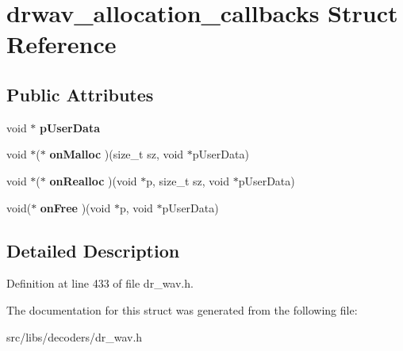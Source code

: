 \hypertarget{structdrwav__allocation__callbacks}{\section{drwav\-\_\-allocation\-\_\-callbacks Struct Reference}
\label{structdrwav__allocation__callbacks}
}
\subsection*{Public Attributes}
\begin{DoxyCompactItemize}
\item 
\hypertarget{structdrwav__allocation__callbacks_a8a89a9b5010d65bbf19c1cd128c5648c}{void $\ast$ {\bfseries p\-User\-Data}}\label{structdrwav__allocation__callbacks_a8a89a9b5010d65bbf19c1cd128c5648c}

\item 
\hypertarget{structdrwav__allocation__callbacks_a303b44dc05da2a99e4fdb189090cfdc4}{void $\ast$($\ast$ {\bfseries on\-Malloc} )(size\-\_\-t sz, void $\ast$p\-User\-Data)}\label{structdrwav__allocation__callbacks_a303b44dc05da2a99e4fdb189090cfdc4}

\item 
\hypertarget{structdrwav__allocation__callbacks_a757fcc87980a24e635aa1d3edbf3f4f9}{void $\ast$($\ast$ {\bfseries on\-Realloc} )(void $\ast$p, size\-\_\-t sz, void $\ast$p\-User\-Data)}\label{structdrwav__allocation__callbacks_a757fcc87980a24e635aa1d3edbf3f4f9}

\item 
\hypertarget{structdrwav__allocation__callbacks_a23edb17e4d5750b4f795f69234565b34}{void($\ast$ {\bfseries on\-Free} )(void $\ast$p, void $\ast$p\-User\-Data)}\label{structdrwav__allocation__callbacks_a23edb17e4d5750b4f795f69234565b34}

\end{DoxyCompactItemize}


\subsection{Detailed Description}


Definition at line 433 of file dr\-\_\-wav.\-h.



The documentation for this struct was generated from the following file\-:\begin{DoxyCompactItemize}
\item 
src/libs/decoders/dr\-\_\-wav.\-h\end{DoxyCompactItemize}
